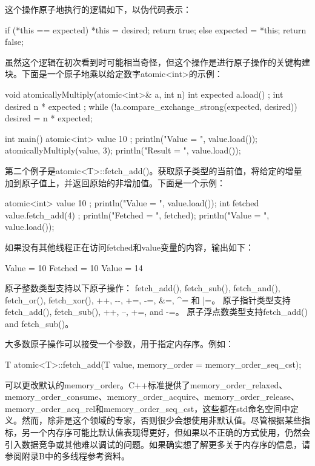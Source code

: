 这个操作原子地执行的逻辑如下，以伪代码表示：

\begin{cpp}
if (*this == expected) {
    *this = desired;
    return true;
} else {
    expected = *this;
    return false;
}
\end{cpp}

虽然这个逻辑在初次看到时可能相当奇怪，但这个操作是进行原子操作的关键构建块。下面是一个原子地乘以给定数字atomic<int>的示例：

\begin{cpp}
void atomicallyMultiply(atomic<int>& a, int n)
{
    int expected { a.load() };
    int desired { n * expected };
    while (!a.compare_exchange_strong(expected, desired)) {
        desired = n * expected;
    }
}

int main()
{
    atomic<int> value { 10 };
    println("Value = {}", value.load());
    atomicallyMultiply(value, 3);
    println("Result = {}", value.load());
}
\end{cpp}

第二个例子是atomic<T>::fetch\_add()。获取原子类型的当前值，将给定的增量加到原子值上，并返回原始的非增加值。下面是一个示例：

\begin{cpp}
atomic<int> value { 10 };
println("Value = {}", value.load());
int fetched { value.fetch_add(4) };
println("Fetched = {}", fetched);
println("Value = {}", value.load());
\end{cpp}

如果没有其他线程正在访问fetched和value变量的内容，输出如下：

\begin{shell}
Value = 10
Fetched = 10
Value = 14
\end{shell}

原子整数类型支持以下原子操作： fetch\_add(), fetch\_sub(), fetch\_and(), fetch\_or(), fetch\_xor(), ++, -{}-, +=, -=, \&=, \^{}= 和 |=。 原子指针类型支持fetch\_add(), fetch\_sub(), ++, --, +=, and -=。 原子浮点数类型支持fetch\_add() and fetch\_sub()。

大多数原子操作可以接受一个参数，用于指定内存序。例如：

\begin{cpp}
T atomic<T>::fetch_add(T value, memory_order = memory_order_seq_cst);
\end{cpp}

可以更改默认的memory\_order。C++标准提供了memory\_order\_relaxed、memory\_order\_consume、memory\_order\_acquire、memory\_order\_release、memory\_order\_acq\_rel和memory\_order\_seq\_cst，这些都在std命名空间中定义。然而，除非是这个领域的专家，否则很少会想使用非默认值。尽管根据某些指标，另一个内存序可能比默认值表现得更好，但如果以不正确的方式使用，仍然会引入数据竞争或其他难以调试的问题。如果确实想了解更多关于内存序的信息，请参阅附录B中的多线程参考资料。

